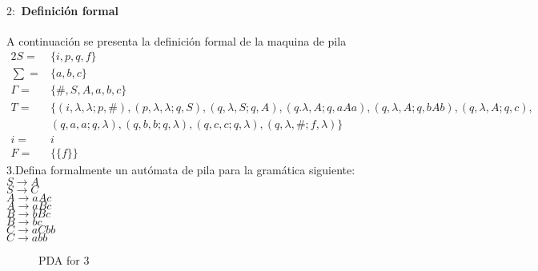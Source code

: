 \documentclass[10pt,a4paper]{book}
\begin{document}
{\paragraph{$2:$ Definición formal}A continuación se presenta la definición formal de la maquina de pila\\[0.2cm]
\begin{alignat*}{2}
	S=& \{i, p,q,f\}\\
	\textstyle \sum=& \{a,b,c\}\\
	\Gamma=&\{\#,S,A,a,b,c\}\\
	T=&\{(i,\lambda,\lambda;p,\#),(p,\lambda,\lambda;q,S),(q,\lambda,S;q,A) , (q.\lambda,A;q,aAa),(q,\lambda,A;q,bAb),(q,\lambda,A;q,c),\\&(q,a,a;q,\lambda),(q,b,b;q,\lambda),(q,c,c;q,\lambda),(q,\lambda,\#;f,\lambda)\}\\
	i=&i\\
	F=&\{\{f\}\}
\end{alignat*}
3.Defina formalmente un autómata de pila para la gramática siguiente:\\[1cm]
$S \rightarrow A$\\
$S \rightarrow C$\\
$A \rightarrow aAc$\\
$A \rightarrow aBc$\\
$B \rightarrow bBc$\\
$B \rightarrow bc$\\
$C \rightarrow aCbb$\\
$C \rightarrow abb$\\
\begin{figure*}[h!]
	\caption{PDA for 3}
\end{figure*}
}
\end{document}
